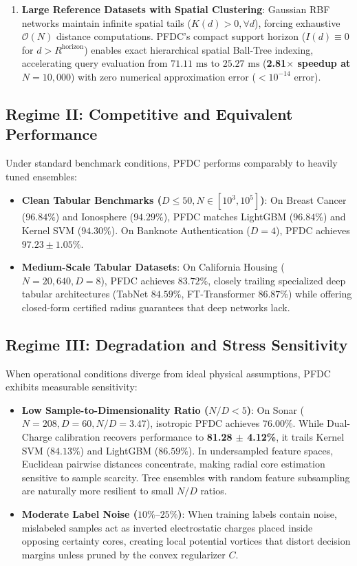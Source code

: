 \documentclass[preprint,review,12pt]{elsarticle}
\begin{document}
\begin{enumerate}
    \item \textbf{Large Reference Datasets with Spatial Clustering}: Gaussian RBF networks maintain infinite spatial tails ($K(d) > 0, \forall d$), forcing exhaustive $\mathcal{O}(N)$ distance computations. PFDC's compact support horizon ($I(d) \equiv 0$ for $d > R^{\mathrm{horizon}}$) enables exact hierarchical spatial Ball-Tree indexing, accelerating query evaluation from $71.11\text{ ms}$ to $25.27\text{ ms}$ (\textbf{2.81$\times$ speedup at $N=10,000$}) with zero numerical approximation error ($< 10^{-14}$ error).
\end{enumerate}

\subsection{Regime II: Competitive and Equivalent Performance}
Under standard benchmark conditions, PFDC performs comparably to heavily tuned ensembles:
\begin{itemize}
    \item \textbf{Clean Tabular Benchmarks ($D \le 50, N \in [10^3, 10^5]$)}: On Breast Cancer ($96.84\%$) and Ionosphere ($94.29\%$), PFDC matches LightGBM ($96.84\%$) and Kernel SVM ($94.30\%$). On Banknote Authentication ($D=4$), PFDC achieves $97.23 \pm 1.05\%$.
    \item \textbf{Medium-Scale Tabular Datasets}: On California Housing ($N=20,640, D=8$), PFDC achieves $83.72\%$, closely trailing specialized deep tabular architectures (TabNet $84.59\%$, FT-Transformer $86.87\%$) while offering closed-form certified radius guarantees that deep networks lack.
\end{itemize}

\subsection{Regime III: Degradation and Stress Sensitivity}
When operational conditions diverge from ideal physical assumptions, PFDC exhibits measurable sensitivity:
\begin{itemize}
    \item \textbf{Low Sample-to-Dimensionality Ratio ($N/D < 5$)}: On Sonar ($N=208, D=60, N/D = 3.47$), isotropic PFDC achieves $76.00\%$. While Dual-Charge calibration recovers performance to \textbf{81.28 $\pm$ 4.12\%}, it trails Kernel SVM ($84.13\%$) and LightGBM ($86.59\%$). In undersampled feature spaces, Euclidean pairwise distances concentrate, making radial core estimation sensitive to sample scarcity. Tree ensembles with random feature subsampling are naturally more resilient to small $N/D$ ratios.
    \item \textbf{Moderate Label Noise ($10\%\text{--}25\%$)}: When training labels contain noise, mislabeled samples act as inverted electrostatic charges placed inside opposing certainty cores, creating local potential vortices that distort decision margins unless pruned by the convex regularizer $C$.
\end{itemize}
\end{document}
